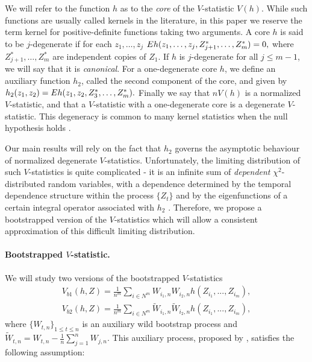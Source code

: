 We will refer to the function $h$ as to the \emph{core} of the $V$-statistic $V(h)$. While such functions are usually called kernels in the literature, in this paper we reserve the term kernel for positive-definite functions taking two arguments. A core $h$ is said to be $j$-degenerate if for each $z_1,\ldots,z_j$ $E h(z_1,\ldots , z_j , Z_{j+1}^*,\ldots ,Z_m^*) = 0,$ where $Z_{j+1}^*,\ldots,Z_m^*$ are independent copies of $Z_1$. If $h$ is $j$-degenerate for all $j\leq m-1$, we will say that it is \emph{canonical}. For a one-degenerate core $h$, we define an auxiliary function $h_2$, called the second component of the core, and given by $h_2(z_1,z_2) = E h(z_1,z_2, Z_3^*,\ldots, Z_m^*).$ Finally we say that $nV(h)$ is a normalized $V$-statistic, and that a $V$-statistic with a one-degenerate core is a degenerate $V$-statistic.  This degeneracy is common to many kernel statistics when the null hypothesis holds \cite{gretton2012kernel,gretton_kernel_2008,sejdinovic2013kernel}.

Our main results will rely on the fact that $h_2$ governs the asymptotic behaviour of normalized degenerate $V$-statistics. Unfortunately, the limiting distribution of such $V$-statistics is quite complicated - it is an infinite sum of \emph{dependent} $\chi^2$-distributed random variables, with a dependence  determined by the temporal dependence structure within the process $\{Z_t\}$ and by the eigenfunctions of a certain integral operator associated with $h_2$ \cite{i._s._borisov_orthogonal_2009,chwialkowski2014kernel}. Therefore, we propose a bootstrapped version of the $V$-statistics which will allow a consistent approximation of this difficult limiting distribution.  

\paragraph{Bootstrapped $V$-statistic.} 
We will study two versions of the bootstrapped $V$-statistics  
\begin{align}
 V_{b1}(h,Z) = \frac{1}{n^m} \sum_{i \in N^m} \nolimits W_{i_1,n} W_{i_2,n} h(Z_{i_1},...,Z_{i_m}), \label{Vb1}\\ 
 V_{b2}(h,Z) = \frac{1}{n^m} \sum_{i \in N^m}  \nolimits \tilde W_{i_1,n}  \tilde W_{i_2,n} h(Z_{i_1},...,Z_{i_m}),\label{Vb2}
\end{align}
where $\{W_{t,n}\}_{1 \leq t \leq n }$ is an auxiliary wild bootstrap process and $\tilde W_{t,n} = W_{t,n} - \frac 1 n \sum_{j=1}^n W_{j,n}$. This auxiliary process, proposed by \cite{Shao2010,leucht_dependent_2013}, satisfies the following assumption:


